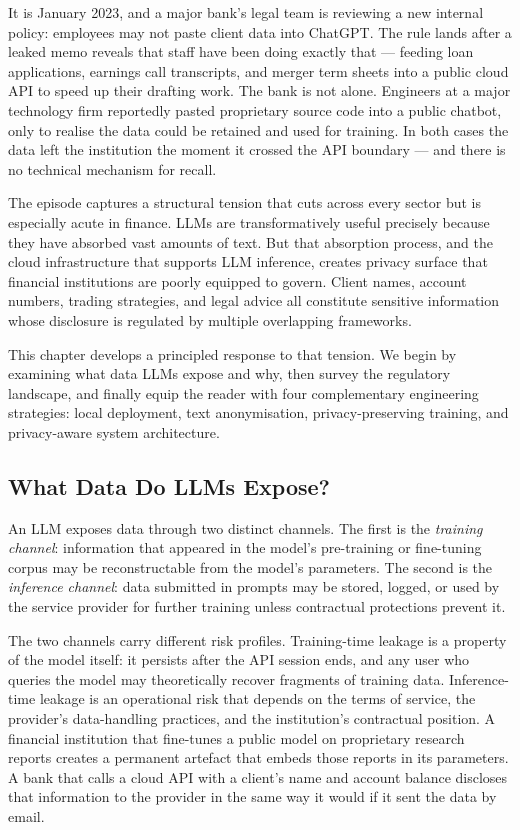 \begin{context}
It is January 2023, and a major bank's legal team is reviewing a new internal policy: employees may not paste client data into ChatGPT. The rule lands after a leaked memo reveals that staff have been doing exactly that — feeding loan applications, earnings call transcripts, and merger term sheets into a public cloud API to speed up their drafting work. The bank is not alone. Engineers at a major technology firm reportedly pasted proprietary source code into a public chatbot, only to realise the data could be retained and used for training. In both cases the data left the institution the moment it crossed the API boundary — and there is no technical mechanism for recall.

The episode captures a structural tension that cuts across every sector but is especially acute in finance. LLMs are transformatively useful precisely because they have absorbed vast amounts of text. But that absorption process, and the cloud infrastructure that supports LLM inference, creates privacy surface that financial institutions are poorly equipped to govern. Client names, account numbers, trading strategies, and legal advice all constitute sensitive information whose disclosure is regulated by multiple overlapping frameworks.

This chapter develops a principled response to that tension. We begin by examining what data LLMs expose and why, then survey the regulatory landscape, and finally equip the reader with four complementary engineering strategies: local deployment, text anonymisation, privacy-preserving training, and privacy-aware system architecture.
\end{context}

\subsection{What Data Do LLMs Expose?}
\label{sec:ch15-exposure}

An LLM exposes data through two distinct channels. The first is the \emph{training channel}: information that appeared in the model's pre-training or fine-tuning corpus may be reconstructable from the model's parameters. The second is the \emph{inference channel}: data submitted in prompts may be stored, logged, or used by the service provider for further training unless contractual protections prevent it.

The two channels carry different risk profiles. Training-time leakage is a property of the model itself: it persists after the API session ends, and any user who queries the model may theoretically recover fragments of training data. Inference-time leakage is an operational risk that depends on the terms of service, the provider's data-handling practices, and the institution's contractual position. A financial institution that fine-tunes a public model on proprietary research reports creates a permanent artefact that embeds those reports in its parameters. A bank that calls a cloud API with a client's name and account balance discloses that information to the provider in the same way it would if it sent the data by email.

